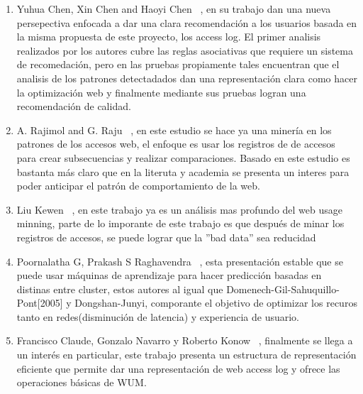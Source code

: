 \documentclass{udparticle}
\begin{document}
\begin{enumerate}
  \item Yuhua Chen, Xin Chen and Haoyi Chen ~\cite{yuhua}, en su trabajo dan una nueva persepectiva enfocada a dar una clara recomendación a los usuarios basada en la misma propuesta de este proyecto, los access log. El primer analisis realizados por los autores cubre las reglas asociativas que requiere un sistema de recomedación, pero en las pruebas propiamente tales encuentran que el analisis de los patrones detectadados dan una representación clara como hacer la optimización web y finalmente mediante sus pruebas logran una recomendación de calidad.


  \item A. Rajimol and G. Raju ~\cite{rajimol}, en este estudio se hace ya una minería en los patrones de los accesos web, el enfoque es usar los registros de de accesos para crear subsecuencias y realizar comparaciones. Basado en este estudio es bastanta más claro que en la literuta y academia se presenta un interes para poder anticipar el patrón de comportamiento de la web.



  \item Liu Kewen ~\cite{kewen}, en este trabajo ya es un análisis mas profundo del web usage minning, parte de lo imporante de este trabajo es que después de minar los registros de accesos, se puede lograr que  la ''bad data'' sea reducidad



  \item Poornalatha G, Prakash S Raghavendra ~\cite{prakash}, esta presentación estable que se puede usar máquinas de aprendizaje para hacer predicción basadas en distinas entre cluster, estos autores al igual que Domenech-Gil-Sahuquillo-Pont[2005] y  Dongshan-Junyi, comporante el objetivo de optimizar los recuros tanto en redes(disminución de latencia) y experiencia de usuario.


  \item Francisco Claude, Gonzalo Navarro y Roberto Konow  ~\cite{BWT}, finalmente se llega a un interés en particular, este trabajo presenta un estructura de representación eficiente que permite dar una representación de web access log y ofrece las operaciones básicas de WUM. 


\end{enumerate}
\end{document}
